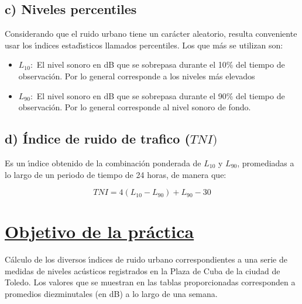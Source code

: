\documentclass[a4paper,12pt]{article}
\begin{document}
\subsection*{c) Niveles percentiles}

Considerando que el ruido urbano tiene un car\'acter aleatorio, resulta conveniente 
usar los \'{\i}ndices estad\'{\i}sticos llamados percentiles. Los que m\'as se utilizan son:
\begin{itemize}
\item $L_{10}:$ El nivel sonoro en dB que se sobrepasa durante el 10\% del tiempo de observaci\'on. 
Por lo general corresponde a los niveles m\'as elevados
\item $L_{90}:$ El nivel sonoro en dB que se sobrepasa durante el 90\% del tiempo de observaci\'on. Por lo general corresponde al nivel sonoro de fondo.
\end{itemize}
\subsection*{d) \'Indice de ruido de trafico ($TNI)$}
Es un \'{\i}ndice obtenido de la combinaci\'on ponderada de $L_{10}$ y $L_{90}$, promediadas 
a lo largo de un periodo de tiempo de 24 horas, de manera que:

\begin{equation}
TNI=4(L_{10}-L_{90})+L_{90}-30
\end{equation}

\section*{\underline{Objetivo de la pr\'actica}}

C\'alculo de los diversos \'{\i}ndices de ruido urbano correspondientes a una serie de medidas 
de niveles ac\'usticos registrados en la Plaza de Cuba de la ciudad de Toledo. Los 
valores que se muestran en las tablas proporcionadas corresponden a promedios 
diezminutales (en dB) a lo largo de una semana.
\end{document}
